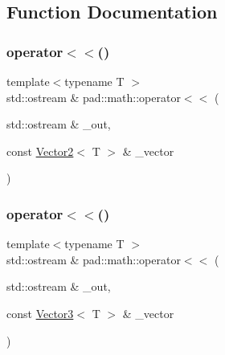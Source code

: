 \subsection{Function Documentation}
\mbox{\label{namespacepad_1_1math_aef2c4cef650688967cb74c75c5d4aafa}} 
\subsubsection{\texorpdfstring{operator$<$$<$()}{operator<<()}\hspace{0.1cm}{\footnotesize\ttfamily [1/3]}}
{\footnotesize\ttfamily template$<$typename T $>$ \\
std\+::ostream \& pad\+::math\+::operator$<$$<$ (\begin{DoxyParamCaption}\item[{std\+::ostream \&}]{\+\_\+out,  }\item[{const \mbox{\hyperlink{structpad_1_1math_1_1_vector2}{Vector2}}$<$ T $>$ \&}]{\+\_\+vector }\end{DoxyParamCaption})}

\mbox{\label{namespacepad_1_1math_a9e468612d54c187ec0eaac48e304e673}} 
\subsubsection{\texorpdfstring{operator$<$$<$()}{operator<<()}\hspace{0.1cm}{\footnotesize\ttfamily [2/3]}}
{\footnotesize\ttfamily template$<$typename T $>$ \\
std\+::ostream \& pad\+::math\+::operator$<$$<$ (\begin{DoxyParamCaption}\item[{std\+::ostream \&}]{\+\_\+out,  }\item[{const \mbox{\hyperlink{structpad_1_1math_1_1_vector3}{Vector3}}$<$ T $>$ \&}]{\+\_\+vector }\end{DoxyParamCaption})}

\mbox{\label{namespacepad_1_1math_aea739f95f7147095cec34ccedee7eea2}} 
